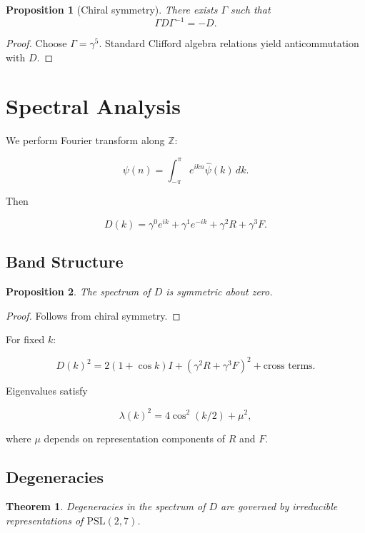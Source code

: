 \documentclass[11pt]{article}
\newtheorem{proposition}{Proposition}
\newtheorem{theorem}{Theorem}
\begin{document}
	\begin{proposition}[Chiral symmetry]
		There exists $\Gamma$ such that
		\[
		\Gamma D \Gamma^{-1} = -D.
		\]
	\end{proposition}
	
	\begin{proof}
		Choose $\Gamma = \gamma^5$.
		Standard Clifford algebra relations yield
		anticommutation with $D$.
	\end{proof}
	
	\section{Spectral Analysis}
	
	We perform Fourier transform along $\mathbb Z$:
	
	\[
	\psi(n) = \int_{-\pi}^{\pi} e^{ikn} \hat\psi(k)\, dk.
	\]
	
	Then
	
	\[
	D(k) = \gamma^0 e^{ik}
	+ \gamma^1 e^{-ik}
	+ \gamma^2 R
	+ \gamma^3 F.
	\]
	
	\subsection{Band Structure}
	
	\begin{proposition}
		The spectrum of $D$ is symmetric about zero.
	\end{proposition}
	
	\begin{proof}
		Follows from chiral symmetry.
	\end{proof}
	
	For fixed $k$:
	
	\[
	D(k)^2 =
	2(1+\cos k) I
	+ (\gamma^2 R + \gamma^3 F)^2
	+ \text{cross terms}.
	\]
	
	Eigenvalues satisfy
	
	\[
	\lambda(k)^2
	=
	4\cos^2(k/2)
	+ \mu^2,
	\]
	
	where $\mu$ depends on representation
	components of $R$ and $F$.
	
	\subsection{Degeneracies}
	
	\begin{theorem}
		Degeneracies in the spectrum of $D$
		are governed by irreducible representations
		of $\mathrm{PSL}(2,7)$.
	\end{theorem}
	
\end{document}
